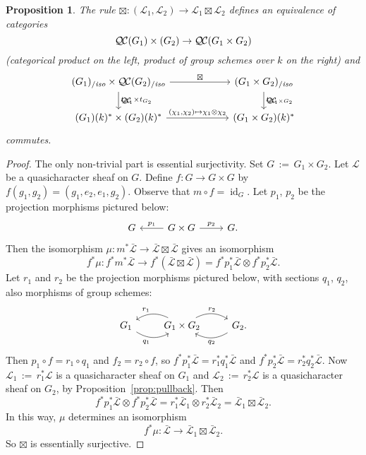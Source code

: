 \documentclass[11pt]{amsart}
\theoremstyle{plain}
\newtheorem{proposition}[theorem]{Proposition}
\theoremstyle{definition}
\theoremstyle{remark}
\newcommand{\Fq}{k}
\DeclareMathOperator{\id}{id}
\newcommand{\ceq}{{\, :=\, }}
\newcommand{\qcs}[1]{{\mathcal{#1}}}
\newcommand{\gqcs}[1]{{\mathcal{\bar #1}}}
\newcommand{\QC}{{\mathcal{Q\hskip-0.8pt C}}}
\newcommand{\QCiso}[1]{\QC(#1)_{/\textit{iso}}}
\newcommand{\trFrob}[1]{t_{#1}}
\begin{document}
\begin{proposition}\label{prop:product}
The rule $\boxtimes : (\qcs{L}_1,\qcs{L}_2)\to \qcs{L}_1\boxtimes\qcs{L}_2$ defines an equivalence of categories 
\[
\QC(G_1)\times (G_2) \to \QC(G_1\times G_2)
\]
(categorical product on the left, product of group schemes over $\Fq$ on the right) and 
\[
\begin{tikzcd}[column sep=60]
\arrow{d}{\trFrob{G_1} \times \trFrob{G_2}} \QCiso{G_1}\times \QCiso{G_2} \arrow{r}{\boxtimes}
& \arrow{d}{\trFrob{G_1\times G_2}} \QCiso{G_1\times G_2}\\
(G_1)(\Fq)^*\times (G_2)(\Fq)^* \arrow{r}{(\chi_1,\chi_2)\mapsto \chi_1\otimes \chi_2}  & (G_1\times G_2)(\Fq)^*
\end{tikzcd}
\]
commutes.
\end{proposition}

\begin{proof}
The only non-trivial part is essential surjectivity. Set $G \ceq G_1\times G_2$.
Let $\qcs{L}$ be a quasicharacter sheaf on $G$. Define $f : G\to G\times G$
by $f(g_1,g_2) = (g_1,e_2,e_1,g_2)$. Observe that $m\circ f = \id_G$. 
Let $p_1$, $p_2$ be the projection morphisms pictured below:
\[
\begin{tikzcd}
G & \arrow[swap]{l}{p_1} G\times G \arrow{r}{p_2} & G.
\end{tikzcd}
\]
Then the isomorphism $\mu : m^* \gqcs{L} \to \gqcs{L}\boxtimes \gqcs{L}$ gives an isomorphism
\[
f^*\mu : f^* m^* \gqcs{L} \to f^*(\gqcs{L}\boxtimes \gqcs{L}) = f^*p_1^*\gqcs{L}\otimes f^* p_2^*\gqcs{L}.
\]
Let $r_1$ and $r_2$ be the projection morphisms pictured below, with sections $q_1$, $q_2$, also morphisms of group schemes:
\[
\begin{tikzcd}
G_1  \arrow[swap, bend right]{r}{q_1} &
\arrow[swap, bend right]{l}{r_1} G_1\times G_2 \arrow[bend left]{r}{r_2} &
\arrow[bend left]{l}{q_2} G_2.
\end{tikzcd}
\]
Then $p_1\circ f = r_1 \circ q_1$ and $f_2 = r_2\circ f$, 
so $f^*p_1^*\gqcs{L} = r_1^* q_1^* \gqcs{L}$ and $f^*p_2^*\gqcs{L} = r_2^* q_2^* \gqcs{L}$. 
Now $\qcs{L}_1 \ceq r_1^* \qcs{L}$ is a quasicharacter sheaf on $G_1$ 
and $\qcs{L}_2 \ceq r_2^* \qcs{L}$ is a quasicharacter sheaf on $G_2$, 
by Proposition~\ref{prop:pullback}. 
Then 
\[
f^*p_1^*\gqcs{L}\otimes f^* p_2^*\gqcs{L} = r_1^*\gqcs{L}_1\otimes r_2^* \gqcs{L}_2 = \gqcs{L}_1\boxtimes \gqcs{L}_2.
\]
In this way, $\mu$ determines an isomorphism
\[
f^*\mu : \gqcs{L} \to  \gqcs{L}_1\boxtimes \gqcs{L}_2.
\]
So $\boxtimes$ is essentially surjective.
\end{proof}
\end{document}
